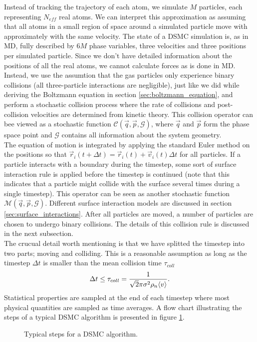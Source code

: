 Instead of tracking the trajectory of each atom, we simulate $M$ particles, each representing $N_{eff}$ real atoms. We can interpret this approximation as assuming that all atoms in a small region of space around a simulated particle move with approximately with the same velocity. The state of a DSMC simulation is, as in MD, fully described by $6M$ phase variables, three velocities and three positions per simulated particle. Since we don't have detailed information about the positions of all the real atoms, we cannot calculate forces as is done in MD. Instead, we use the assumtion that the gas particles only experience binary collisions (all three-particle interactions are negligible), just like we did while deriving the Boltzmann equation in section \ref{sec:boltzmann_equation}, and perform a stochastic collision process where the rate of collisions and post-collision velocities are determined from kinetic theory. This collision operator can bee viewed as a stochastic function $\mathcal{C}(\vec q, \vec p, \mathcal{G})$, where $\vec q$ and $\vec p$ form the phase space point and $\mathcal G$ contains all information about the system geometry.\\
The equation of motion is integrated by applying the standard Euler method on the positions so that $\vec r_i(t+\Delta t) = \vec r_i(t) + \vec v_i(t)\Delta t$ for all particles. If a particle interacts with a boundary during the timestep, some sort of surface interaction rule is applied before the timestep is continued (note that this indicates that a particle might collide with the surface several times during a single timestep). This operator can be seen as another stochastic function $\mathcal{M}(\vec q, \vec p, \mathcal{G})$. Different surface interaction models are discussed in section \ref{sec:surface_interactions}. After all particles are moved, a number of particles are chosen to undergo binary collisions. The details of this collision rule is discussed in the next subsection.\\
The crucual detail worth mentioning is that we have splitted the timestep into two parts; moving and colliding. This is a reasonable assumption as long as the timestep $\Delta t$ is smaller than the mean collision time $\tau_{coll}$
\begin{align}
	\Delta t \leq \tau_{coll} = {1\over \sqrt 2 \pi \sigma^2 \rho_n \langle v \rangle}.
\end{align}
Statistical properties are sampled at the end of each timestep where most physical quantities are sampled as time averages. A flow chart illustrating the steps of a typical DSMC algorithm is presented in figure \ref{fig:dsmc_flowchart}.
\begin{figure}[h]
\begin{center}
\label{fig:dsmc_flowchart}
\end{center}
\caption{Typical steps for a DSMC algorithm.}
\end{figure}

